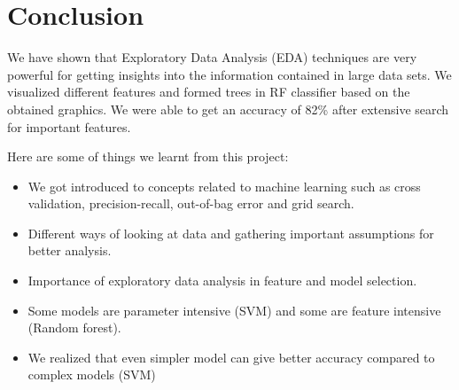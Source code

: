 \section{Conclusion}
\vspace{-0.1in}

We have shown that Exploratory Data Analysis (EDA) techniques are very powerful for getting insights into the information contained in large data sets. We visualized different features and formed trees in RF classifier based on the obtained graphics. We were able to get an accuracy of 82\% after extensive search for important features.

Here are some of things we learnt from this project:
\begin{itemize}

\item We got introduced to concepts related to machine learning such as cross validation, precision-recall, out-of-bag error and grid search.
\item Different ways of looking at data and gathering important assumptions for better analysis.
\item Importance of exploratory data analysis in feature and model selection.
\item Some models are parameter intensive (SVM) and some are feature intensive (Random forest).
\item We realized that even simpler model can give better accuracy compared to complex models (SVM)
\end{itemize}


